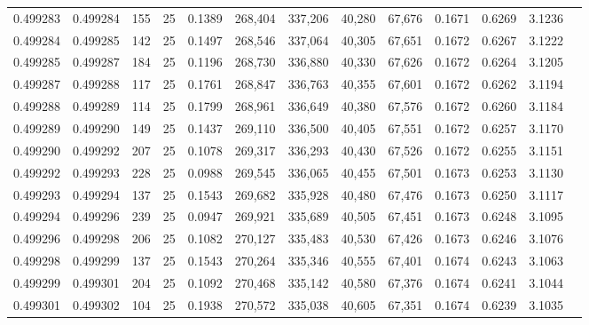 \begin{tabular}{rrrrrrrrrrrrr}
0.499283 & 0.499284 & 155 &  25 &                                     0.1389 & 268,404 & 337,206 &  40,280 &  67,676 & 0.1671 & 0.6269 & 3.1236 \\
0.499284 & 0.499285 & 142 &  25 &                                     0.1497 & 268,546 & 337,064 &  40,305 &  67,651 & 0.1672 & 0.6267 & 3.1222 \\
0.499285 & 0.499287 & 184 &  25 &                                     0.1196 & 268,730 & 336,880 &  40,330 &  67,626 & 0.1672 & 0.6264 & 3.1205 \\
0.499287 & 0.499288 & 117 &  25 &                                     0.1761 & 268,847 & 336,763 &  40,355 &  67,601 & 0.1672 & 0.6262 & 3.1194 \\
0.499288 & 0.499289 & 114 &  25 &                                     0.1799 & 268,961 & 336,649 &  40,380 &  67,576 & 0.1672 & 0.6260 & 3.1184 \\
0.499289 & 0.499290 & 149 &  25 &                                     0.1437 & 269,110 & 336,500 &  40,405 &  67,551 & 0.1672 & 0.6257 & 3.1170 \\
0.499290 & 0.499292 & 207 &  25 &                                     0.1078 & 269,317 & 336,293 &  40,430 &  67,526 & 0.1672 & 0.6255 & 3.1151 \\
0.499292 & 0.499293 & 228 &  25 &                                     0.0988 & 269,545 & 336,065 &  40,455 &  67,501 & 0.1673 & 0.6253 & 3.1130 \\
0.499293 & 0.499294 & 137 &  25 &                                     0.1543 & 269,682 & 335,928 &  40,480 &  67,476 & 0.1673 & 0.6250 & 3.1117 \\
0.499294 & 0.499296 & 239 &  25 &                                     0.0947 & 269,921 & 335,689 &  40,505 &  67,451 & 0.1673 & 0.6248 & 3.1095 \\
0.499296 & 0.499298 & 206 &  25 &                                     0.1082 & 270,127 & 335,483 &  40,530 &  67,426 & 0.1673 & 0.6246 & 3.1076 \\
0.499298 & 0.499299 & 137 &  25 &                                     0.1543 & 270,264 & 335,346 &  40,555 &  67,401 & 0.1674 & 0.6243 & 3.1063 \\
0.499299 & 0.499301 & 204 &  25 &                                     0.1092 & 270,468 & 335,142 &  40,580 &  67,376 & 0.1674 & 0.6241 & 3.1044 \\
0.499301 & 0.499302 & 104 &  25 &                                     0.1938 & 270,572 & 335,038 &  40,605 &  67,351 & 0.1674 & 0.6239 & 3.1035 \\

\end{tabular}
